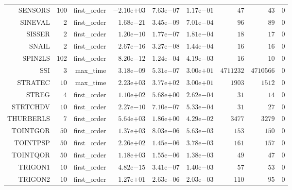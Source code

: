 \begin{longtable}{rrrrrrrrr}
SENSORS & \(   100\) & first\_order & \(-2.10\)e\(+03\) & \( 7.63\)e\(-07\) & \( 1.17\)e\(-01\) & \(    47\) & \(    43\) & \(     0\) \\
SINEVAL & \(     2\) & first\_order & \( 1.68\)e\(-21\) & \( 3.45\)e\(-09\) & \( 7.01\)e\(-04\) & \(    96\) & \(    89\) & \(     0\) \\
SISSER & \(     2\) & first\_order & \( 1.20\)e\(-10\) & \( 1.77\)e\(-07\) & \( 1.81\)e\(-04\) & \(    18\) & \(    17\) & \(     0\) \\
SNAIL & \(     2\) & first\_order & \( 2.67\)e\(-16\) & \( 3.27\)e\(-08\) & \( 1.44\)e\(-04\) & \(    16\) & \(    16\) & \(     0\) \\
SPIN2LS & \(   102\) & first\_order & \( 8.20\)e\(-12\) & \( 1.24\)e\(-04\) & \( 4.19\)e\(-03\) & \(    16\) & \(    10\) & \(     0\) \\
SSI & \(     3\) & max\_time & \( 3.18\)e\(-09\) & \( 5.31\)e\(-07\) & \( 3.00\)e\(+01\) & \(4711232\) & \(4710566\) & \(     0\) \\
STRATEC & \(    10\) & max\_time & \( 2.23\)e\(+03\) & \( 3.77\)e\(+02\) & \( 3.00\)e\(+01\) & \(  1903\) & \(  1512\) & \(     0\) \\
STREG & \(     4\) & first\_order & \( 1.10\)e\(+02\) & \( 5.68\)e\(+00\) & \( 2.62\)e\(-04\) & \(    31\) & \(    14\) & \(     0\) \\
STRTCHDV & \(    10\) & first\_order & \( 2.27\)e\(-10\) & \( 7.10\)e\(-07\) & \( 5.33\)e\(-04\) & \(    31\) & \(    27\) & \(     0\) \\
THURBERLS & \(     7\) & first\_order & \( 5.64\)e\(+03\) & \( 1.86\)e\(+00\) & \( 4.29\)e\(-02\) & \(  3477\) & \(  3279\) & \(     0\) \\
TOINTGOR & \(    50\) & first\_order & \( 1.37\)e\(+03\) & \( 8.03\)e\(-06\) & \( 5.63\)e\(-03\) & \(   153\) & \(   150\) & \(     0\) \\
TOINTPSP & \(    50\) & first\_order & \( 2.26\)e\(+02\) & \( 1.45\)e\(-06\) & \( 3.78\)e\(-03\) & \(   161\) & \(   157\) & \(     0\) \\
TOINTQOR & \(    50\) & first\_order & \( 1.18\)e\(+03\) & \( 1.55\)e\(-06\) & \( 1.38\)e\(-03\) & \(    49\) & \(    47\) & \(     0\) \\
TRIGON1 & \(    10\) & first\_order & \( 4.82\)e\(-15\) & \( 3.41\)e\(-07\) & \( 1.40\)e\(-03\) & \(    57\) & \(    53\) & \(     0\) \\
TRIGON2 & \(    10\) & first\_order & \( 1.27\)e\(+01\) & \( 2.63\)e\(-06\) & \( 2.03\)e\(-03\) & \(   110\) & \(    95\) & \(     0\) \\

\end{longtable}
